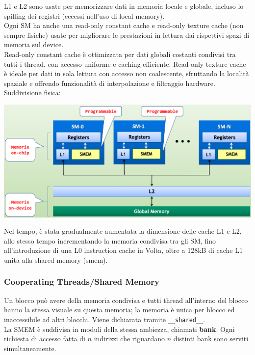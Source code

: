 L1 e L2 sono usate per memorizzare dati in memoria locale e globale, incluso lo spilling dei registri (eccessi nell'uso di local memory). \\

Ogni SM ha anche una read-only constant cache e read-only texture cache (non sempre fisiche) usate per migliorare le prestazioni in lettura dai rispettivi spazi di memoria sul device. \\

Read-only constant cache è ottimizzata per dati globali costanti condivisi tra tutti i thread, con accesso uniforme e caching efficiente. Read-only texture cache è ideale per dati in sola lettura con accesso non coalescente, sfruttando la località spaziale e offrendo funzionalità di interpolazione e filtraggio hardware. \\

Suddivisione fisica:
\begin{center}
	\includegraphics[width=0.9\linewidth]{img/cuda/mem1}
\end{center}

Nel tempo, è stata gradualmente aumentata la dimensione delle cache L1 e L2, allo stesso tempo incrementando la memoria condivisa tra gli SM, fino all'introduzione di una L0 instruction cache in Volta, oltre a 128kB di cache L1 unita alla shared memory (smem).\\

\newpage

\subsubsection{Cooperating Threads/Shared Memory}
Un blocco può avere della memoria condivisa e tutti thread all'interno del blocco hanno la stessa visuale su questa memoria; la memoria è unica per blocco ed inaccessibile ad altri blocchi. Viene dichiarata tramite \texttt{\_\_shared\_\_}.\\

La SMEM è suddivisa in moduli della stessa ambiezza, chiamati \textbf{bank}. Ogni richiesta di accesso fatta di $n$ indirizzi che riguardano $n$ distinti bank sono serviti simultaneamente.\\

